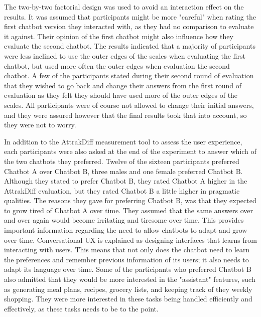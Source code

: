 The two-by-two factorial design was used to avoid an interaction effect on the results. It was assumed that participants might be more "careful" when rating the first chatbot version they interacted with, as they had no comparison to evaluate it against. Their opinion of the first chatbot might also influence how they evaluate the second chatbot. The results indicated that a majority of participants were less inclined to use the outer edges of the scales when evaluating the first chatbot, but used more often the outer edges when evaluation the second chatbot. A few of the participants stated during their second round of evaluation that they wished to go back and change their answers from the first round of evaluation as they felt they should have used more of the outer edges of the scales. All participants were of course not allowed to change their initial answers, and they were assured however that the final results took that into account, so they were not to worry. 

In addition to the AttrakDiff measurement tool to assess the user experience, each participants were also asked at the end of the experiment to answer which of the two chatbots they preferred. Twelve of the sixteen participants preferred Chatbot A over Chatbot B, three males and one female preferred Chatbot B. Although they stated to prefer Chatbot B, they rated Chatbot A higher in the AttrakDiff evaluation, but they rated Chatbot B a little higher in pragmatic qualities. The reasons they gave for preferring Chatbot B, was that they expected to grow tired of Chatbot A over time. They assumed that the same answers over and over again would become irritating and tiresome over time. This provides important information regarding the need to allow chatbots to adapt and grow over time. Conversational UX is explained as designing interfaces that learns from interacting with users. This means that not only does the chatbot need to learn the preferences and remember previous information of its users; it also needs to adapt its language over time. Some of the participants who preferred Chatbot B also admitted that they would be more interested in the "assistant" features, such as generating meal plans, recipes, grocery lists, and keeping track of they weekly shopping. They were more interested in these tasks being handled efficiently and effectively, as these tasks needs to be to the point. 


